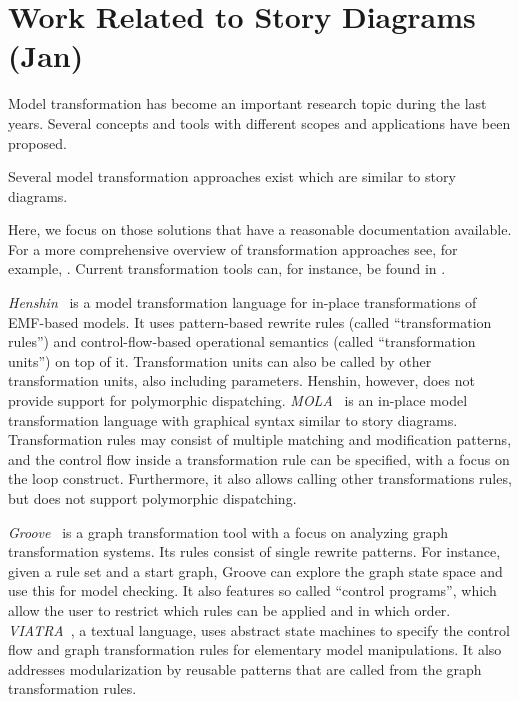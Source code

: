 \section{Work Related to Story Diagrams (Jan)}

Model transformation has become an important research topic during the last years.
Several concepts and tools with different scopes and applications have been proposed.

Several model transformation approaches exist which are similar to story diagrams.

Here, we focus on those solutions that have a reasonable documentation available.
For a more comprehensive overview of transformation approaches see, for example, \cite{Czarnecki06}.
Current transformation tools can, for instance, be found in \cite{TTC2010}.

\emph{Henshin}~\cite{henshin2} is a model transformation language for in-place transformations of EMF-based models.
It uses pattern-based rewrite rules (called ``transformation rules'') and control-flow-based operational semantics (called ``transformation units'') on top of it.
Transformation units can also be called by other transformation units, also including parameters.
Henshin, however, does not provide support for polymorphic dispatching.
\emph{MOLA}~\cite{mola} is an in-place model transformation language with graphical syntax similar to story diagrams.
Transformation rules may consist of multiple matching and modification patterns, and the control flow inside a transformation rule can be specified, with a focus on the loop construct.  
Furthermore, it also allows calling other transformations rules, but does not support polymorphic dispatching.

\emph{Groove}~\cite{Ren04a}  is a graph transformation tool with a focus on analyzing graph transformation systems.
Its rules consist of single rewrite patterns.
For instance, given a rule set and a start graph, Groove can explore the graph state space and use this for model checking.
It also features so called ``control programs'', which allow the user to restrict which rules can be applied and in which order.
\emph{VIATRA}~\cite{viatra}, a textual language, uses abstract state machines to specify the control flow and graph transformation rules for elementary model manipulations.
It also addresses modularization by reusable patterns that are called from the graph transformation rules. 

